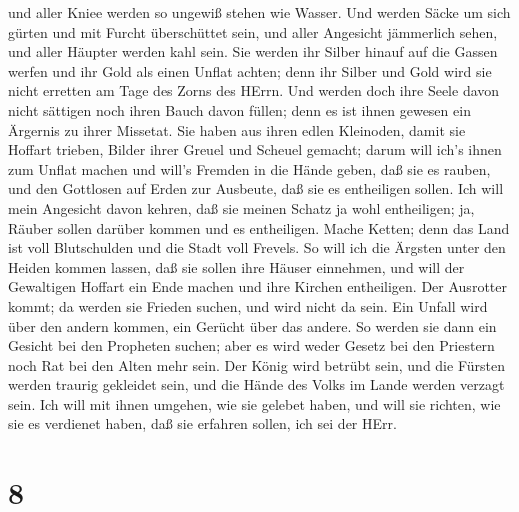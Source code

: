 und aller Kniee werden so ungewiß stehen wie Wasser.  Und
werden Säcke um sich gürten und mit Furcht überschüttet sein, und aller
Angesicht jämmerlich sehen, und aller Häupter werden kahl sein.
 Sie werden ihr Silber hinauf auf die Gassen werfen und ihr
Gold als einen Unflat achten; denn ihr Silber und Gold wird sie nicht
erretten am Tage des Zorns des HErrn. Und werden doch ihre Seele davon
nicht sättigen noch ihren Bauch davon füllen; denn es ist ihnen gewesen
ein Ärgernis zu ihrer Missetat.  Sie haben aus ihren edlen
Kleinoden, damit sie Hoffart trieben, Bilder ihrer Greuel und Scheuel
gemacht; darum will ich's ihnen zum Unflat machen  und
will's Fremden in die Hände geben, daß sie es rauben, und den Gottlosen
auf Erden zur Ausbeute, daß sie es entheiligen sollen.  Ich
will mein Angesicht davon kehren, daß sie meinen Schatz ja wohl
entheiligen; ja, Räuber sollen darüber kommen und es entheiligen.
 Mache Ketten; denn das Land ist voll Blutschulden und die
Stadt voll Frevels.  So will ich die Ärgsten unter den
Heiden kommen lassen, daß sie sollen ihre Häuser einnehmen, und will der
Gewaltigen Hoffart ein Ende machen und ihre Kirchen entheiligen.
 Der Ausrotter kommt; da werden sie Frieden suchen, und
wird nicht da sein.  Ein Unfall wird über den andern
kommen, ein Gerücht über das andere. So werden sie dann ein Gesicht bei
den Propheten suchen; aber es wird weder Gesetz bei den Priestern noch
Rat bei den Alten mehr sein.  Der König wird betrübt sein,
und die Fürsten werden traurig gekleidet sein, und die Hände des Volks
im Lande werden verzagt sein. Ich will mit ihnen umgehen, wie sie
gelebet haben, und will sie richten, wie sie es verdienet haben, daß sie
erfahren sollen, ich sei der HErr.

\hypertarget{section-7}{%
\section{8}\label{section-7}}

